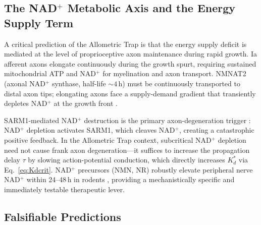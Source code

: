 \documentclass[12pt, letterpaper]{article}
\newcommand{\Kdcrit}{K_d^{*}}
\begin{document}
\subsection{The NAD$^{+}$ Metabolic Axis and the Energy Supply Term}

A critical prediction of the Allometric Trap is that the energy supply deficit
is mediated at the level of proprioceptive axon maintenance during rapid growth.
Ia afferent axons elongate continuously during the growth spurt, requiring
sustained mitochondrial ATP and NAD$^{+}$ for myelination and axon transport.
NMNAT2 (axonal NAD$^{+}$ synthase, half-life $\sim 4$\,h) must be continuously
transported to distal axon tips; elongating axons face a supply-demand gradient
that transiently depletes NAD$^{+}$ at the growth front \citep{Sasaki2009}.

SARM1-mediated NAD$^{+}$ destruction is the primary axon-degeneration trigger
\citep{Gerdts2016}: NAD$^{+}$ depletion activates SARM1, which cleaves NAD$^{+}$,
creating a catastrophic positive feedback. In the Allometric Trap context,
subcritical NAD$^{+}$ depletion need not cause frank axon degeneration---it
suffices to increase the propagation delay $\tau$ by slowing action-potential
conduction, which directly increases $\Kdcrit$ via Eq.~\eqref{eq:Kdcrit}.
NAD$^{+}$ precursors (NMN, NR) robustly elevate peripheral nerve NAD$^{+}$
within 24--48\,h in rodents \citep{Mills2016}, providing a mechanistically
specific and immediately testable therapeutic lever.

\subsection{Falsifiable Predictions}
\end{document}
